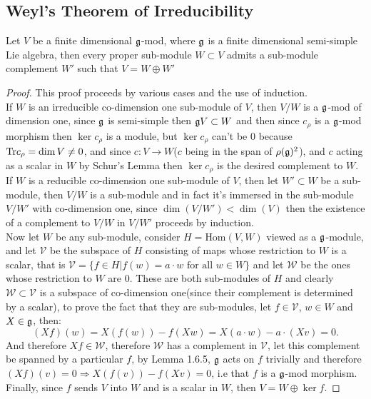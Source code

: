 \subsection*{Weyl's Theorem of Irreducibility}
\begin{teo}
	Let $V$ be a finite dimensional $\mathfrak{g}$-mod, where $\mathfrak{g}$ is a finite dimensional semi-simple Lie algebra, then every proper sub-module $W\subset V$ admits a sub-module complement $W'$ such that $V=W\oplus W'$
	\label{Weyl's Theorem}
\end{teo}
\begin{proof}
	This proof proceeds by various cases and the use of induction.\\
	If $W$ is an irreducible co-dimension one sub-module of $V$, then $V/W$ is a $\mathfrak{g}$-mod of dimension one, since $\mathfrak{g}$ is semi-simple then $\mathfrak{g} V \subset W$ and then since $c_\rho$ is a $\mathfrak{g}$-mod morphism then $\ker c_\rho$ is a module, but $\ker c_\rho$ can't be $0$ because $\text{Tr} c_\rho = \dim V \not=0$, and since $c:V\rightarrow W$($c$ being in the span of $\rho(\mathfrak{g})^2$), and $c$ acting as a scalar in $W$ by Schur's Lemma then $\ker c_\rho$ is the desired complement to $W$.\\
	If $W$ is a reducible co-dimension one sub-module of $V$, then let $W'\subset W$ be a sub-module, then $V/W$ is a sub-module and in fact it's immersed in the sub-module $V/W'$ with co-dimension one, since $\dim(V/W')<\dim(V)$ then the existence of a complement to $V/W$ in $V/W'$ proceeds by induction.\\
	Now let $W$ be any sub-module, consider $H=\text{Hom}(V,W)$ viewed as a $\mathfrak{g}$-module, and let $\mathcal{V}$ be the subspace of $H$ consisting of maps whose restriction to $W$ is a scalar, that is $\mathcal{V}=\{f \in H | f(w)=a\cdot w \text{ for all } w \in W\}$ and let $\mathcal{W}$ be the ones whose restriction to $W$ are $0$. These are both sub-modules of $H$ and clearly $\mathcal{W} \subset \mathcal{V}$ is a subspace of co-dimension one(since their complement is determined by a scalar), to prove the fact that they are sub-modules, let $f \in \mathcal{V}$, $w \in W$ and $X \in \mathfrak{g}$, then:
	$$(Xf)(w) = X(f(w)) - f(Xw) = X(a\cdot w)-a\cdot (Xv) = 0.$$
	And therefore $Xf \in \mathcal{W}$, therefore $\mathcal{W}$ has a complement in $\mathcal{V}$, let this complement be spanned by a particular $f$, by Lemma 1.6.5, $\mathfrak{g}$ acts on $f$ trivially and therefore $(Xf)(v) = 0 \Rightarrow X(f(v)) - f(Xv)=0$, i.e that $f$ is a $\mathfrak{g}$-mod morphism. Finally, since $f$ sends $V$ into $W$ and is a scalar in $W$, then $V=W \oplus \ker f$. 
\end{proof} 